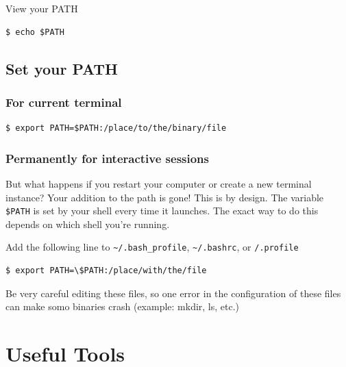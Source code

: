 \documentclass{article}
\newenvironment{blocktemplateIII}[1]{%
    \tcolorbox[beamer,%
    noparskip,breakable,
    ,colframe=Red,%
    colbacklower=LimeGreen!75!LightGreen,%
    title=#1]}%
    {\endtcolorbox}
\newenvironment{codetemplate}[1][]{%
  \mybasecolorbox[#1]
  \itshape
}{%
  \endmybasecolorbox
}
\begin{document}
View your PATH
\begin{codetemplate}{}
\begin{verbatim}
$ echo $PATH
\end{verbatim}
\end{codetemplate}

\subsection{Set your PATH}
\subsubsection{For current terminal}
\begin{codetemplate}{}
\begin{verbatim}
$ export PATH=$PATH:/place/to/the/binary/file
\end{verbatim}
\end{codetemplate}

\subsubsection{Permanently for interactive sessions}

But what happens if you restart your computer or create a new terminal instance? Your addition to the path is gone! This is by design. The variable \verb|$PATH| is set by your shell every time it launches. The exact way to do this depends on which shell you're running.

Add the following line to \verb|~/.bash_profile|, \verb|~/.bashrc|, or \verb|/.profile|

\begin{codetemplate}{}
\begin{verbatim}
$ export PATH=\$PATH:/place/with/the/file
\end{verbatim}
\end{codetemplate}

\begin{blocktemplateIII}{Nota}
Be very careful editing these files, so one error in the configuration of these files can make somo binaries crash (example: mkdir, ls, etc.)
\end{blocktemplateIII}

\newpage
\section{Useful Tools}
\end{document}
